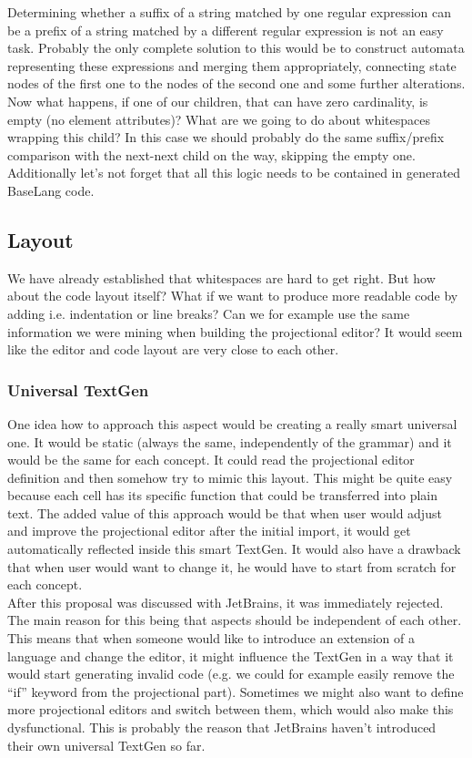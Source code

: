 Determining whether a suffix of a string matched by one regular expression can be a prefix of a string matched by a different regular expression is not an easy task. Probably the only complete solution to this would be to construct automata representing these expressions and merging them appropriately, connecting state nodes of the first one to the nodes of the second one and some further alterations.
\\

Now what happens, if one of our children, that can have zero cardinality, is empty (no element attributes)? What are we going to do about whitespaces wrapping this child? In this case we should probably do the same suffix/prefix comparison with the next-next child on the way, skipping the empty one. Additionally let's not forget that all this logic needs to be contained in generated BaseLang code.

\subsection{Layout}

We have already established that whitespaces are hard to get right. But how about the code layout itself? What if we want to produce more readable code by adding i.e. indentation or line breaks? Can we for example use the same information we were mining when building the projectional editor? It would seem like the editor and code layout are very close to each other. 

\subsubsection{Universal TextGen}
One idea how to approach this aspect would be creating a really smart universal one. It would be static (always the same, independently of the grammar) and it would be the same for each concept. It could read the projectional editor definition and then somehow try to mimic this layout. This might be quite easy because each cell has its specific function that could be transferred into plain text. The added value of this approach would be that when user would adjust and improve the projectional editor after the initial import, it would get automatically reflected inside this smart TextGen. It would also have a drawback that when user would want to change it, he would have to start from scratch for each concept.
\\

After this proposal was discussed with JetBrains, it was immediately rejected. The main reason for this being that aspects should be independent of each other. This means that when someone would like to introduce an extension of a language and change the editor, it might influence the TextGen in a way that it would start generating invalid code (e.g. we could for example easily remove the “if” keyword from the projectional part). Sometimes we might also want to define more projectional editors and switch between them, which would also make this dysfunctional. This is probably the reason that JetBrains haven't introduced their own universal TextGen so far.

